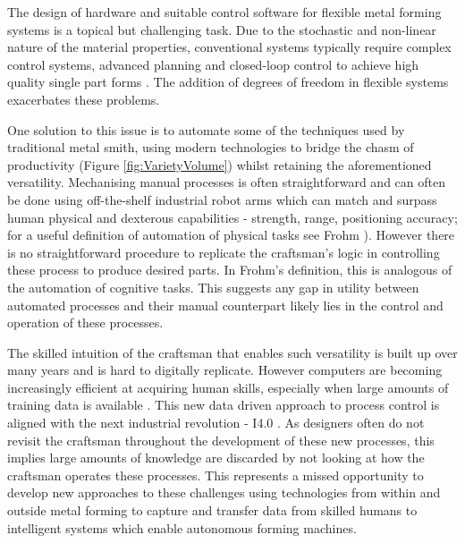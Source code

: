 The design of hardware and suitable control software for flexible metal forming systems is a topical but challenging task. Due to the stochastic and non-linear nature of the material properties, conventional systems typically require complex control systems, advanced planning and closed-loop control to achieve high quality single part forms  \citep{Allwood2016Closed-loopForming, Tekkaya2015MetalProperties, Polyblank2014Closed-loopProspectus}. The addition of degrees of freedom in flexible systems exacerbates these problems. 

One solution to this issue is to automate some of the techniques used by traditional metal smith, using modern technologies to bridge the chasm of productivity (Figure \ref{fig:VarietyVolume}) whilst retaining the aforementioned versatility. Mechanising manual processes is often straightforward and can often be done using off-the-shelf industrial robot arms which can match and surpass human physical and dexterous capabilities - strength, range, positioning accuracy; for a useful definition of automation of physical tasks see Frohm \citep{Frohm2008LevelsManufacturing}). However there is no straightforward procedure to replicate the craftsman's logic in controlling these process to produce desired parts. In  Frohm's definition, this is analogous of the automation of cognitive tasks. This suggests any gap in utility between automated processes and their manual counterpart likely lies in the control and operation of these processes.

The skilled intuition of the craftsman that enables such versatility is built up over many years and is hard to digitally replicate. However computers are becoming increasingly efficient at acquiring human skills, especially when large amounts of training data is available \citep{Ford2016TheUnemployment}. This new data driven approach to process control is aligned with the next industrial revolution - I4.0 \citep{Zhong2017IntelligentReview}. %
As designers often do not revisit the craftsman throughout the development of these new processes, this implies large amounts of knowledge are discarded by not looking at how the craftsman operates these processes. This represents a missed opportunity to develop new approaches to these challenges using technologies from within and outside metal forming to capture and transfer data from skilled humans to intelligent systems which enable autonomous forming machines.

